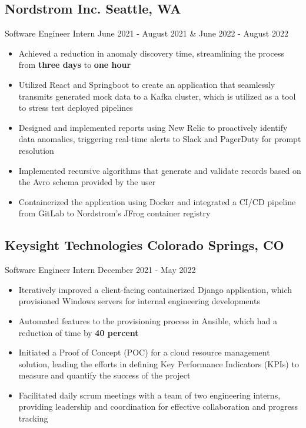 \documentclass[a4,10pt]{article}
\newcommand{\subtext}[1]{
#1\par\vspace{-0.2cm}}
\newenvironment{zitemize}{
\begin{itemize}\itemsep0pt \parskip0pt \parsep1pt}
{\end{itemize}\vspace{-0.5cm}}
\begin{document}
\subsection*{Nordstrom Inc. \hfill Seattle, WA} 
\subtext{Software Engineer Intern \hfill June 2021 - August 2021 \& June 2022 - August 2022} 
    \begin{zitemize}
        \item Achieved a reduction in anomaly discovery time, streamlining the process from \textbf{three days} to \textbf{one hour}
         \item Utilized React and Springboot to create an application that seamlessly transmits generated mock data to a Kafka cluster, which is utilized as a tool to stress test deployed pipelines
        \item Designed and implemented reports using New Relic to proactively identify data anomalies, triggering real-time alerts to Slack and PagerDuty for prompt resolution
        \item Implemented recursive algorithms that generate and validate records based on the Avro schema provided by the user
        \item Containerized the application using Docker and integrated a CI/CD pipeline from GitLab to Nordstrom's JFrog container registry


        
    
    \end{zitemize}



\subsection*{Keysight Technologies \hfill Colorado Springs, CO} 
\subtext{Software Engineer Intern \hfill December 2021 - May 2022}
    \begin{zitemize}
        \item Iteratively improved a client-facing containerized Django application, which provisioned Windows servers for internal engineering developments
        \item Automated features to the provisioning process in Ansible, which had a reduction of time by \textbf{40 percent}
        \item Initiated a Proof of Concept (POC) for a cloud resource management solution, leading the efforts in defining Key Performance Indicators (KPIs) to measure and quantify the success of the project
        \item Facilitated daily scrum meetings with a team of two engineering interns, providing leadership and coordination for effective collaboration and progress tracking
    
    \end{zitemize}
\end{document}
